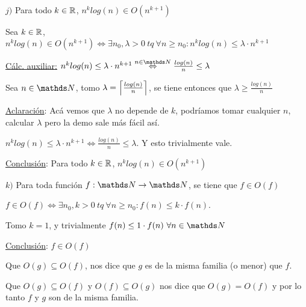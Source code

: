 \documentclass[10pt,a4paper]{article}
\begin{document}
\par $j)$ Para todo \ensuremath{k \in \reales}, \ensuremath{n^{k}log(n) \in O(n^{k+1})}
\demoline
\begin{groupIzq}{2.5em}
  \par Sea \ensuremath{k \in \reales}, \ensuremath{n^{k}log(n) \in O(n^{k+1}) \Leftrightarrow \exists n_0, \lambda > 0\ tq\ \forall n \geq n_0 : n^{k}log(n) \leq \lambda \cdot n^{k+1}}
  \par \underline{Cálc. auxiliar:} \ensuremath{n^{k}log(n) \leq \lambda \cdot n^{k+1} \overset{n \in \nat}{\Leftrightarrow} \frac{log(n)}{n} \leq \lambda}
  \par Sea \ensuremath{n \in \nat}, tomo \ensuremath{\lambda = \ceil{\frac{log(n)}{n}}}, se tiene entonces que \ensuremath{\lambda \geq \frac{log(n)}{n}}
  \par \underline{Aclaración}: Acá vemos que \ensuremath{\lambda} no depende de \ensuremath{k}, podríamos tomar cualquier \ensuremath{n}, calcular \ensuremath{\lambda} pero la demo sale más fácil así.
  \par \ensuremath{n^{k}log(n) \leq \lambda \cdot n^{k+1} \Leftrightarrow \frac{log(n)}{n} \leq \lambda}. Y esto trivialmente vale.
  \par \underline{Conclusión}: Para todo \ensuremath{k \in \reales}, \ensuremath{n^{k}log(n) \in O(n^{k+1})}
\end{groupIzq}

\demoline
\demoline
\par $k)$ Para toda función \ensuremath{f: \nat \rightarrow \nat}, se tiene que \ensuremath{f \in O(f)}
\demoline
\begin{groupIzq}{2.5em}
  \par \ensuremath{f \in O(f) \Leftrightarrow \exists n_0, k > 0\ tq\ \forall n \geq n_0 : f(n) \leq k \cdot f(n)}.
  \par Tomo \ensuremath{k = 1}, y trivialmente \ensuremath{f(n) \leq 1 \cdot f(n)\ \forall n \in \nat}
  \par \underline{Conclusión}: \ensuremath{f \in O(f)}
\end{groupIzq}

\newpage

\par Que \ensuremath{O(g) \subseteq O(f)}, nos dice que \ensuremath{g} es de la misma familia (o menor) que \ensuremath{f}.
\par Que \ensuremath{O(g) \subseteq O(f)} y \ensuremath{O(f) \subseteq O(g)} nos dice que \ensuremath{O(g) = O(f)} y por lo tanto \ensuremath{f} y \ensuremath{g} son de la misma familia.
\end{document}

